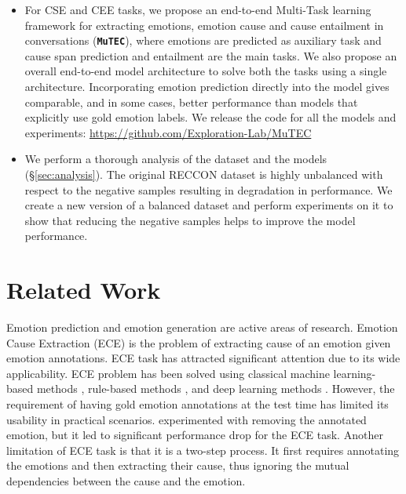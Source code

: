 \documentclass{article}
\newcommand{\modelname}{\textbf{\texttt{MuTEC}}}
\begin{document}
\begin{itemize}[noitemsep,topsep=0pt]
\item For CSE and CEE tasks, we propose an end-to-end Multi-Task learning framework for extracting emotions, emotion cause and cause entailment in conversations (\modelname), where emotions are predicted as auxiliary task and cause span prediction and entailment are the main tasks. We also propose an overall end-to-end model architecture to solve both the tasks using a single architecture. Incorporating emotion prediction directly into the model gives comparable, and in some cases, better performance than models that explicitly use gold emotion labels. We release the code for all the models and experiments: \url{https://github.com/Exploration-Lab/MuTEC}
\item We perform a thorough analysis of the dataset and the models (\S\ref{sec:analysis}). The original RECCON dataset is highly unbalanced with respect to the negative samples resulting in degradation in performance. We create a new version of a balanced dataset and perform experiments on it to show that reducing the negative samples helps to improve the model performance.  
\end{itemize}

















%
 \section{Related Work} \label{sec:related}
\vspace{-3mm}

Emotion prediction \cite{joshi-etal-2022-cogmen,bansal-etal-2022-shapes,gargiEmoDef} and emotion generation \cite{colombo-etal-2019-affect,goswamy-etal-2020-adapting} are active areas of research. Emotion Cause Extraction (ECE) \cite{chen2010emotion} is the problem of extracting cause of an emotion given emotion annotations. ECE task has attracted significant attention due to its wide applicability. ECE problem has been solved using classical machine learning-based methods \cite{gui-etal-2016-event}, rule-based methods \cite{russo-etal-2011-emocause, neviarouskaya2013extracting}, and deep learning methods \cite{cheng2017emotion, xia2019rthn, li2019context, li2018co, xiao2019context, xu2019extracting, singh-etal-2021-end}. However, the requirement of having gold emotion annotations at the test time has limited its usability in practical scenarios. \citet{li2018co} experimented with removing the annotated emotion, but it led to significant performance drop for the ECE task. Another limitation of ECE task is that it is a two-step process. It first requires annotating the emotions and then extracting their cause, thus ignoring the mutual dependencies between the cause and the emotion. 
\end{document}

